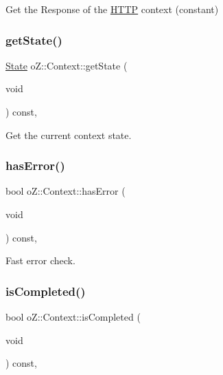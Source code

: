 Get the Response of the \mbox{\hyperlink{namespaceo_z_1_1_h_t_t_p}{H\+T\+TP}} context (constant) 

\mbox{\label{classo_z_1_1_context_af912acc5fa475aa1e835a71df1752ef5}} 
\subsubsection{\texorpdfstring{getState()}{getState()}}
{\footnotesize\ttfamily \mbox{\hyperlink{namespaceo_z_a356b278f7c65def0cae75fca8cae268e}{State}} o\+Z\+::\+Context\+::get\+State (\begin{DoxyParamCaption}\item[{void}]{ }\end{DoxyParamCaption}) const\hspace{0.3cm}{\ttfamily [inline]}, {\ttfamily [noexcept]}}



Get the current context\textquotesingle{} state. 

\mbox{\label{classo_z_1_1_context_a53afdf1400b5ec8429b09da40662a34d}} 
\subsubsection{\texorpdfstring{hasError()}{hasError()}}
{\footnotesize\ttfamily bool o\+Z\+::\+Context\+::has\+Error (\begin{DoxyParamCaption}\item[{void}]{ }\end{DoxyParamCaption}) const\hspace{0.3cm}{\ttfamily [inline]}, {\ttfamily [noexcept]}}



Fast error check. 

\mbox{\label{classo_z_1_1_context_ac5dd957a1f76f466b86a179ed3146967}} 
\subsubsection{\texorpdfstring{isCompleted()}{isCompleted()}}
{\footnotesize\ttfamily bool o\+Z\+::\+Context\+::is\+Completed (\begin{DoxyParamCaption}\item[{void}]{ }\end{DoxyParamCaption}) const\hspace{0.3cm}{\ttfamily [inline]}, {\ttfamily [noexcept]}}



